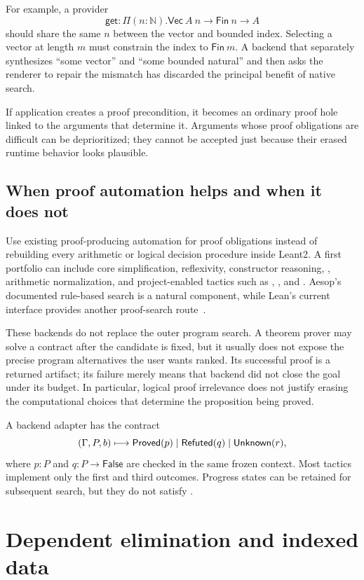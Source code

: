 For example, a provider
\[
  \mathsf{get}:\Pi(n:\mathbb N).\mathsf{Vec}\ A\ n\to\mathsf{Fin}\ n\to A
\]
should share the same $n$ between the vector and bounded index. Selecting a vector at length $m$ must constrain the index to $\mathsf{Fin}\ m$. A backend that separately synthesizes ``some vector'' and ``some bounded natural'' and then asks the renderer to repair the mismatch has discarded the principal benefit of native search.

If application creates a proof precondition, it becomes an ordinary proof hole linked to the arguments that determine it. Arguments whose proof obligations are difficult can be deprioritized; they cannot be accepted just because their erased runtime behavior looks plausible.

\subsection{When proof automation helps and when it does not}
Use existing proof-producing automation for proof obligations instead of rebuilding every arithmetic or logical decision procedure inside Leant2. A first portfolio can include core simplification, reflexivity, constructor reasoning, , arithmetic normalization, and project-enabled tactics such as , , and . Aesop's documented rule-based search is a natural component, while Lean's current  interface provides another proof-search route~\cite{aesop,grind}.

These backends do not replace the outer program search. A theorem prover may solve a contract after the candidate is fixed, but it usually does not expose the precise program alternatives the user wants ranked. Its successful proof is a returned artifact; its failure merely means that backend did not close the goal under its budget. In particular, logical proof irrelevance does not justify erasing the computational choices that determine the proposition being proved.

A backend adapter has the contract
\[
 (\Gamma,P,b)\longmapsto
 \mathsf{Proved}(p)\;|\;\mathsf{Refuted}(q)\;|\;\mathsf{Unknown}(r),
\]
where $p:P$ and $q:P\to\mathsf{False}$ are checked in the same frozen context. Most tactics implement only the first and third outcomes. Progress states can be retained for subsequent search, but they do not satisfy .

\section{Dependent elimination and indexed data}
\label{sec:dependent}
